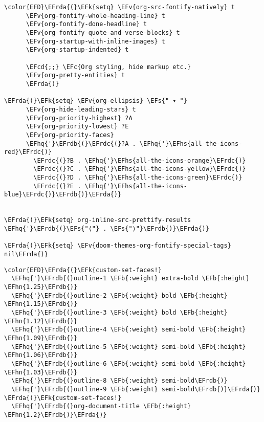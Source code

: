 \documentclass[c]{article}
\theoremstyle{plain}%
\theoremstyle{definition}
\theoremstyle{remark}
\newcommand{\EFc}[1]{\textcolor{EFc}{#1}} %
\newcommand{\EFcd}[1]{\textcolor{EFcd}{#1}} %
\newcommand{\EFs}[1]{\textcolor{EFs}{#1}} %
\newcommand{\EFk}[1]{\textcolor{EFk}{#1}} %
\newcommand{\EFb}[1]{\textcolor{EFb}{#1}} %
\newcommand{\EFv}[1]{\textcolor{EFv}{#1}} %
\newcommand{\EFhn}[1]{\textcolor{EFhn}{\textbf{#1}}} %
\newcommand{\EFhq}[1]{\textcolor{EFhq}{#1}} %
\newcommand{\EFhs}[1]{\textcolor{EFhs}{#1}} %
\newcommand{\EFrda}[1]{\textcolor{EFrda}{#1}} %
\newcommand{\EFrdb}[1]{\textcolor{EFrdb}{#1}} %
\newcommand{\EFrdc}[1]{\textcolor{EFrdc}{#1}} %
\begin{document}
\begin{Code}
\begin{Verbatim}
\color{EFD}\EFrda{(}\EFk{setq} \EFv{org-src-fontify-natively} t
      \EFv{org-fontify-whole-heading-line} t
      \EFv{org-fontify-done-headline} t
      \EFv{org-fontify-quote-and-verse-blocks} t
      \EFv{org-startup-with-inline-images} t
      \EFv{org-startup-indented} t

      \EFcd{;;} \EFc{Org styling, hide markup etc.}
      \EFv{org-pretty-entities} t
      \EFrda{)}

\EFrda{(}\EFk{setq} \EFv{org-ellipsis} \EFs{" ▾ "}
      \EFv{org-hide-leading-stars} t
      \EFv{org-priority-highest} ?A
      \EFv{org-priority-lowest} ?E
      \EFv{org-priority-faces}
      \EFhq{'}\EFrdb{(}\EFrdc{(}?A . \EFhq{'}\EFhs{all-the-icons-red}\EFrdc{)}
        \EFrdc{(}?B . \EFhq{'}\EFhs{all-the-icons-orange}\EFrdc{)}
        \EFrdc{(}?C . \EFhq{'}\EFhs{all-the-icons-yellow}\EFrdc{)}
        \EFrdc{(}?D . \EFhq{'}\EFhs{all-the-icons-green}\EFrdc{)}
        \EFrdc{(}?E . \EFhq{'}\EFhs{all-the-icons-blue}\EFrdc{)}\EFrdb{)}\EFrda{)}


\EFrda{(}\EFk{setq} org-inline-src-prettify-results \EFhq{'}\EFrdb{(}\EFs{"⟨"} . \EFs{"⟩"}\EFrdb{)}\EFrda{)}

\EFrda{(}\EFk{setq} \EFv{doom-themes-org-fontify-special-tags} nil\EFrda{)}
\end{Verbatim}
\end{Code}

\begin{Code}
\begin{Verbatim}
\color{EFD}\EFrda{(}\EFk{custom-set-faces!}
  \EFhq{'}\EFrdb{(}outline-1 \EFb{:weight} extra-bold \EFb{:height} \EFhn{1.25}\EFrdb{)}
  \EFhq{'}\EFrdb{(}outline-2 \EFb{:weight} bold \EFb{:height} \EFhn{1.15}\EFrdb{)}
  \EFhq{'}\EFrdb{(}outline-3 \EFb{:weight} bold \EFb{:height} \EFhn{1.12}\EFrdb{)}
  \EFhq{'}\EFrdb{(}outline-4 \EFb{:weight} semi-bold \EFb{:height} \EFhn{1.09}\EFrdb{)}
  \EFhq{'}\EFrdb{(}outline-5 \EFb{:weight} semi-bold \EFb{:height} \EFhn{1.06}\EFrdb{)}
  \EFhq{'}\EFrdb{(}outline-6 \EFb{:weight} semi-bold \EFb{:height} \EFhn{1.03}\EFrdb{)}
  \EFhq{'}\EFrdb{(}outline-8 \EFb{:weight} semi-bold\EFrdb{)}
  \EFhq{'}\EFrdb{(}outline-9 \EFb{:weight} semi-bold\EFrdb{)}\EFrda{)}
\EFrda{(}\EFk{custom-set-faces!}
  \EFhq{'}\EFrdb{(}org-document-title \EFb{:height} \EFhn{1.2}\EFrdb{)}\EFrda{)}
\end{Verbatim}
\end{Code}
\end{document}
